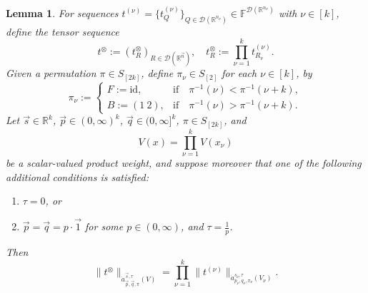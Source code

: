 \documentclass[11pt, reqno]{amsart}
\newtheorem{lemma}[theorem]{Lemma}
\theoremstyle{definition}
\theoremstyle{remark}
\numberwithin{equation}{section}
\newcommand{\D}{\mathscr D}
\newcommand{\F}{\mathbb F}
\newcommand{\R}{\mathbb R}
\newcommand{\vone}{\vec 1}
\newcommand{\vn}{\vec n}
\newcommand{\vp}{\vec p}
\newcommand{\vq}{\vec q}
\newcommand{\vs}{\vec s}
\newcommand{\atau}{\dot a^{\vs,\tau}_{\vp,\vq,\pi}}
\newcommand{\id}{\mathrm{id}}
\newcommand{\Norm}[2]{\|#1\|_{#2}}
\begin{document}
\begin{lemma}\label{t tensor}
For sequences $t^{(\nu)}=\{t^{(\nu)}_Q\}_{Q\in\D(\R^{n_\nu})}\in\F^{\D(\R^{n_\nu})}$ with $\nu\in[k]$, define the tensor sequence
\begin{equation*}
t^{\otimes}:=(t^{\otimes}_R)_{R\in\D(\R^{\vn})},\quad
t^{\otimes}_R:=\prod_{\nu=1}^k t^{(\nu)}_{R_\nu}.
\end{equation*}
Given a permutation $\pi\in S_{[2k]}$, define $\pi_\nu\in S_{[2]}$ for each $\nu\in[k]$, by
\begin{equation*}
\pi_\nu:=\begin{cases}F:=\id, & \text{if}\quad \pi^{-1}(\nu)<\pi^{-1}(\nu+k), \\
B:=(1\ 2), & \text{if}\quad \pi^{-1}(\nu)>\pi^{-1}(\nu+k).\end{cases}
\end{equation*}
Let $\vs\in\R^k$, $\vp\in(0,\infty)^k$, $\vq\in(0,\infty]^k$, $\pi\in S_{[2k]}$, and
\begin{equation*}
V(x)=\prod_{\nu=1}^k V(x_\nu)
\end{equation*}
be a scalar-valued product weight, and suppose moreover that one of the following additional conditions is satisfied:
\begin{enumerate}[\rm(i)]
\item\label{tau=0} $\tau=0$, or
\item\label{crit} $\vp=\vq=p\cdot\vone$ for some $p\in(0,\infty)$, and $\tau=\frac1p$.
\end{enumerate}
Then
\begin{equation*}
\Norm{t^\otimes}{\atau(V)}=\prod_{\nu=1}^k \Norm{t^{(\nu)}}{ \dot a^{s_\nu,\tau}_{p_\nu,q_\nu,\pi_\nu}(V_\nu) }.
\end{equation*}
\end{lemma}
\end{document}
